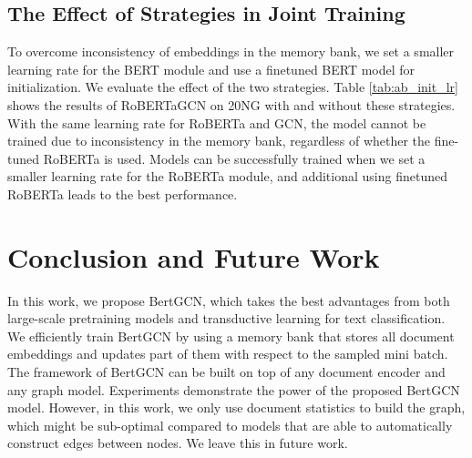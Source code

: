 \documentclass[11pt,a4paper]{article}
\begin{document}
\subsection{The Effect of Strategies in Joint Training }
\begin{table}
  \small
  \centering
  \caption{Accuracy on 20NG development set for different strategies. ``finetune'' means we use the finetuned RoBERTa as initialization, and ``small lr.'' means we use a smaller learning rate for the RoBERTa module.}
  \label{tab:ab_init_lr}
\end{table}

To overcome inconsistency of embeddings in the memory bank, we set a smaller learning rate for the BERT module and use a finetuned BERT model for initialization. We evaluate the effect of the two strategies. Table \ref{tab:ab_init_lr} shows the  results of RoBERTaGCN on 20NG with and without these strategies. 
With the same learning rate for RoBERTa and GCN, the model cannot be trained due to inconsistency in the memory bank, regardless of whether the fine-tuned RoBERTa is used. Models can be successfully trained when we set a smaller learning rate for the RoBERTa module, and additional using finetuned RoBERTa leads to the best performance.

\section{Conclusion and Future Work}
In this work, we propose BertGCN, which takes the best advantages from both large-scale pretraining models and transductive learning for text classification. We efficiently train BertGCN by using a memory bank that stores all document embeddings and updates part of them with respect to the sampled mini batch. 
The framework of BertGCN can be built on top of any document encoder and any graph model. 
Experiments demonstrate the power of the proposed BertGCN model. However, in this work, we only use document statistics to build the graph, which might be sub-optimal compared to models that are able to automatically construct edges between nodes. We leave this in future work.
\end{document}
